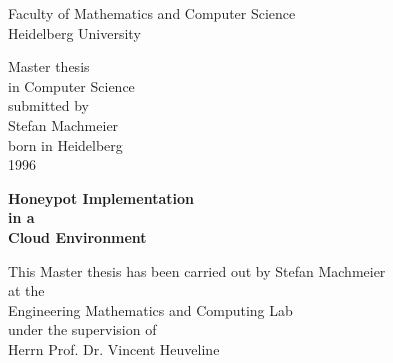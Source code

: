 \thispagestyle{empty}
\begin{center}
  \renewcommand{\baselinestretch}{2.00}
  \Large\sffamily
  Faculty of Mathematics and Computer Science\\
  \large Heidelberg University
  \par\vfill\normalfont
  Master thesis\\
  in Computer Science\\
  submitted by\\
  Stefan Machmeier\\
  born in Heidelberg\\
  1996
\end{center}
\newpage

\thispagestyle{empty}
\begin{center}
  \renewcommand{\baselinestretch}{2.00}
  \Large\bfseries\sffamily
    Honeypot Implementation\\
    in a\\
    Cloud Environment
  \par
  \vfill
  \large\normalfont
  This Master thesis has been carried out by Stefan Machmeier\\
  at the\\
  Engineering Mathematics and Computing Lab\\
  under the supervision of\\
  Herrn Prof. Dr. Vincent Heuveline
\end{center}\par
\vspace{5\baselineskip}

\renewcommand{\baselinestretch}{1.00}\normalsize

